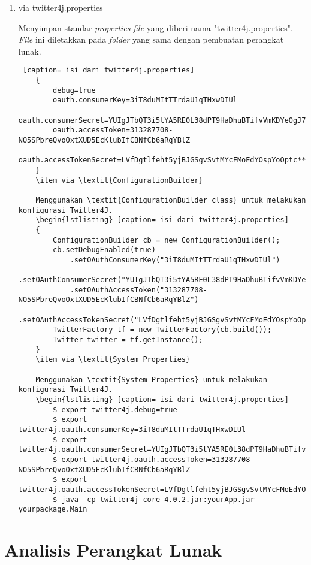 \begin{enumerate}
	\item via twitter4j.properties
	
	Menyimpan standar \textit{properties} \textit{file} yang diberi nama "twitter4j.properties". \textit{File} ini diletakkan pada \textit{folder} yang sama dengan pembuatan perangkat lunak.
	\begin{lstlisting} [caption= isi dari twitter4j.properties]
	{
		debug=true
		oauth.consumerKey=3iT8duMItTTrdaU1qTHxwDIUl
		oauth.consumerSecret=YUIgJTbQT3i5tYA5RE0L38dPT9HaDhuBTifvVmKDYeOgJ7****
		oauth.accessToken=313287708-NO5SPbreQvoOxtXUD5EcKlubIfCBNfCb6aRqYBlZ
		oauth.accessTokenSecret=LVfDgtlfeht5yjBJGSgvSvtMYcFMoEdYOspYoOptc****
	}
	\item via \textit{ConfigurationBuilder}
	
	Menggunakan \textit{ConfigurationBuilder class} untuk melakukan konfigurasi Twitter4J.
	\begin{lstlisting} [caption= isi dari twitter4j.properties]
	{
		ConfigurationBuilder cb = new ConfigurationBuilder();
		cb.setDebugEnabled(true)
			.setOAuthConsumerKey("3iT8duMItTTrdaU1qTHxwDIUl")
			.setOAuthConsumerSecret("YUIgJTbQT3i5tYA5RE0L38dPT9HaDhuBTifvVmKDYeOgJ7****")
			.setOAuthAccessToken("313287708-NO5SPbreQvoOxtXUD5EcKlubIfCBNfCb6aRqYBlZ")
			.setOAuthAccessTokenSecret("LVfDgtlfeht5yjBJGSgvSvtMYcFMoEdYOspYoOptc****");
		TwitterFactory tf = new TwitterFactory(cb.build());
		Twitter twitter = tf.getInstance();
	}
	\item via \textit{System Properties}
	
	Menggunakan \textit{System Properties} untuk melakukan konfigurasi Twitter4J.
	\begin{lstlisting} [caption= isi dari twitter4j.properties]
		$ export twitter4j.debug=true
		$ export twitter4j.oauth.consumerKey=3iT8duMItTTrdaU1qTHxwDIUl
		$ export twitter4j.oauth.consumerSecret=YUIgJTbQT3i5tYA5RE0L38dPT9HaDhuBTifvVmKDYeOgJ7****
		$ export twitter4j.oauth.accessToken=313287708-NO5SPbreQvoOxtXUD5EcKlubIfCBNfCb6aRqYBlZ
		$ export twitter4j.oauth.accessTokenSecret=LVfDgtlfeht5yjBJGSgvSvtMYcFMoEdYOspYoOptc****
		$ java -cp twitter4j-core-4.0.2.jar:yourApp.jar yourpackage.Main
	\end{lstlisting}
\end{enumerate}

\section{Analisis Perangkat Lunak}

